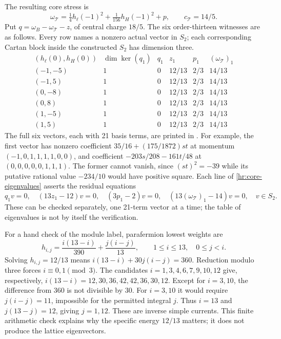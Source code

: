 The resulting core stress is
\[
 \omega_{\mathcal T}
 =\tfrac14h_{\ell}(-1)^2+\tfrac1{156}h_H(-1)^2+p,
 \qquad c_{\mathcal T}=14/5.
\]
Put $q=\omega_B-\omega_{\mathcal T}-z$, of central charge $18/5$.
The six order-thirteen witnesses are as follows. Every row names a
nonzero actual vector in $S_2$; each corresponding Cartan block
inside the constructed $S_2$ has dimension three.
\begin{equation}
\begin{array}{c|rrrrr}
 (h_{\ell}(0),h_H(0))&\dim\ker(q_1)&q_1&z_1&p_1&
                      (\omega_{\mathcal T})_1\\\hline
 (-1,-5)&1&0&12/13&2/3&14/13\\
 (-1, 5)&1&0&12/13&2/3&14/13\\
 ( 0,-8)&1&0&12/13&2/3&14/13\\
 ( 0, 8)&1&0&12/13&2/3&14/13\\
 ( 1,-5)&1&0&12/13&2/3&14/13\\
 ( 1, 5)&1&0&12/13&2/3&14/13
\end{array}
\label{hr:core-eigenvalues}
\end{equation}
The full six vectors, each with 21 basis terms, are printed in
. For example, the first vector
has nonzero coefficient
$35/16+(175/1872)st$ at momentum $(-1,0,1,1,1,1,0,0)$,
and coefficient $-203s/208-161t/48$ at $(0,0,0,0,0,1,1,1)$.
The former cannot vanish, since $(st)^2=-39$ while its putative
rational value $-234/10$ would have positive square.
Each line of \eqref{hr:core-eigenvalues} asserts the residual equations
\[
 q_1v=0,
 \quad(13z_1-12)v=0,
 \quad(3p_1-2)v=0,
 \quad(13(\omega_{\mathcal T})_1-14)v=0,
 \quad v\in S_2.
\]
These can be checked separately, one 21-term vector at a time;
the table of eigenvalues is not by itself the verification.

For a hand check of the module label, parafermion lowest weights are
\[
 h_{i,j}=\frac{i(13-i)}{390}+\frac{j(i-j)}{13},
 \qquad 1\leq i\leq13,\quad 0\leq j<i.
\]
Solving $h_{i,j}=12/13$ means
$i(13-i)+30j(i-j)=360$. Reduction modulo three forces
$i\equiv0,1\pmod3$. The candidates $i=1,3,4,6,7,9,10,12$
give, respectively, $i(13-i)=12,30,36,42,42,36,30,12$.
Except for $i=3,10$, the difference from 360 is not divisible
by 30. For $i=3,10$ it would require $j(i-j)=11$, impossible
for the permitted integral $j$. Thus $i=13$ and
$j(13-j)=12$, giving $j=1,12$. These are inverse simple
currents. This finite arithmetic check explains why the specific
energy $12/13$ matters; it does not produce the lattice eigenvectors.

